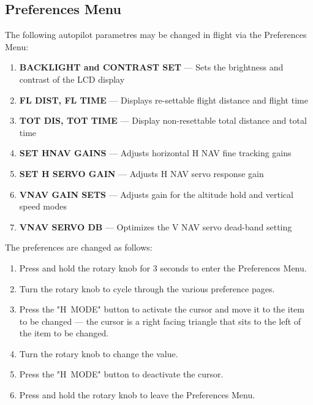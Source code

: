 \subsection*{Preferences Menu}
The following autopilot parametres may be changed in flight via the Preferences Menu:

\begin{enumerate}
\item \textbf{BACKLIGHT and CONTRAST SET} --- Sets the brightness and contrast of the LCD display
\item \textbf{FL DIST, FL TIME} --- Displays re-settable flight distance and flight time
\item \textbf{TOT DIS, TOT TIME} --- Display non-resettable total distance and total time
\item \textbf{SET HNAV GAINS} --- Adjusts horizontal H NAV fine tracking gains
\item \textbf{SET H SERVO GAIN} --- Adjusts H NAV servo response gain
\item \textbf{VNAV GAIN SETS} --- Adjusts gain for the altitude hold and vertical speed modes
\item \textbf{VNAV SERVO DB} --- Optimizes the V NAV servo dead-band setting
\end{enumerate}

The preferences are changed as follows:

\begin{enumerate}
\item Press and hold the rotary knob for 3 seconds to enter the Preferences Menu. 
\item Turn the rotary knob to cycle through the various preference pages. 
\item Press the "H~MODE" button to activate the cursor and move it to the item to be changed --- the cursor is a right facing triangle that sits to the left of the item to be changed. 
\item Turn the rotary knob to change the value.
\item Press the "H~MODE" button to deactivate the cursor. 
\item Press and hold the rotary knob to leave the Preferences Menu.
\end{enumerate}

